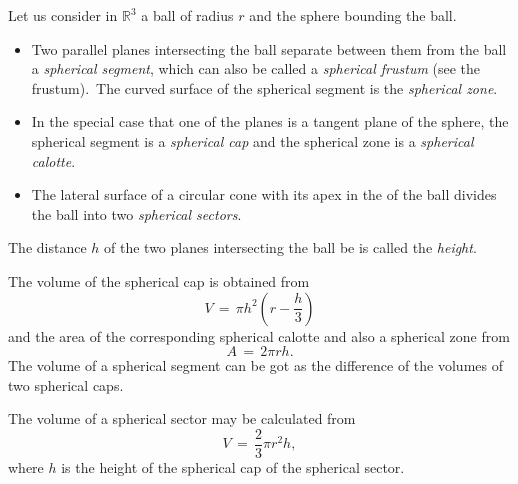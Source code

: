 \documentclass[12pt]{article}
\theoremstyle{definition}
\begin{document}

Let us consider in $\mathbb{R}^3$ a ball of radius $r$ and the sphere bounding the ball.
\begin{itemize}

\item Two parallel planes intersecting the ball separate between them from the ball a {\em spherical segment}, which can also be called a {\em spherical frustum} (see the frustum).\, The curved surface of the spherical segment is the {\em spherical zone}.

\item In the special case that one of the planes is a tangent plane of the sphere, the spherical segment is a {\em spherical cap} and the spherical zone is a {\em spherical calotte}.

\item The lateral surface of a circular cone with its apex in the  of the ball divides the ball into two {\em spherical sectors}.
\end{itemize}

The distance $h$ of the two planes intersecting the ball be is called the {\em height}.

The volume of the spherical cap is obtained from
$$V \,=\, \pi h^2\left(r\!-\!\frac{h}{3}\right)$$
and the area of the corresponding spherical calotte and also a spherical zone from
$$A \,=\, 2\pi rh.$$
The volume of a spherical segment can be got as the difference of the volumes of two spherical caps.

The volume of a spherical sector may be calculated from
$$V \,=\, \frac{2}{3}\pi r^2h,$$
where $h$ is the height of the spherical cap of the spherical sector.

\end{document}
